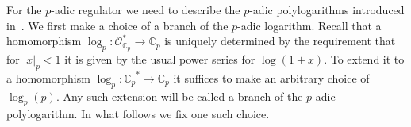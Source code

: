 \documentclass{amsart}
\begin{document}
For the {$p$-adic{\futurelet{}}} regulator we need to describe the {$p$-adic{\futurelet{}}} polylogarithms
introduced in~\cite{Col82}. We first make a choice of a branch of
the {$p$-adic{\futurelet{}}} logarithm. Recall that a homomorphism $\log_p: {\mathcal O}_{{\mathbb C_p}}^*
\to {{\mathbb C_p}}$ is uniquely determined by the requirement that for $|x|_p<1$
it is given by the usual power series for $\log(1+x)$. To extend it to a
homomorphism $\log_p: {{\mathbb C_p}}^* \to {{\mathbb C_p}}$ it suffices to make an arbitrary choice
of $\log_p(p)$. Any such extension will be called a branch of the
$p$-adic polylogarithm. In what follows we fix one such choice.
\end{document}
